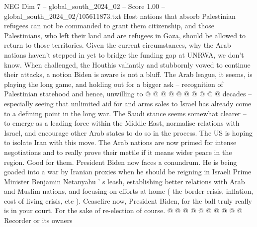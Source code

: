 \begin{textsample}{NEG Dim 7 – global\_south\_2024\_02 – Score 1.00 – global\_south\_2024\_02/105611873.txt}
Host nations that absorb Palestinian refugees can not be commanded to grant them citizenship, and those Palestinians, who left their land and are refugees in Gaza, should be allowed to return to those territories.
Given the current circumstances, why the Arab nations haven't stepped in yet to bridge the funding gap at UNRWA, we don't know.
When challenged, the Houthis valiantly and stubbornly vowed to continue their attacks, a notion Biden is aware is not a bluff.
The Arab league, it seems, is playing the long game, and holding out for a bigger ask -- recognition of Palestinian statehood and hence, unwilling to @ @ @ @ @ @ @ @ @ @ decades -- especially seeing that unlimited aid for and arms sales to Israel has already come to a defining point in the long war.
The Saudi stance seems somewhat clearer -- to emerge as a leading force within the Middle East, normalise relations with Israel, and encourage other Arab states to do so in the process.
The US is hoping to isolate Iran with this move.
The Arab nations are now primed for intense negotiations and to really prove their mettle if it means wider peace in the region.
Good for them.
President Biden now faces a conundrum.
He is being goaded into a war by Iranian proxies when he should be reigning in Israeli Prime Minister Benjamin Netanyahu ' s leash, establishing better relations with Arab and Muslim nations, and focusing on efforts at home ( the border crisis, inflation, cost of living crisis, etc ).
Ceasefire now, President Biden, for the ball truly really is in your court.
For the sake of re-election of course. @ @ @ @ @ @ @ @ @ @ Recorder or its owners

\end{textsample}
